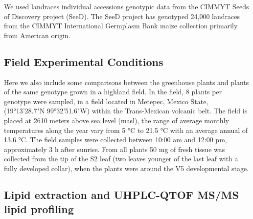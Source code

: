\documentclass[9pt,twocolumn,twoside,lineno]{gsajnl}
\begin{document}
We used landraces individual accessions genotypic data from the CIMMYT Seeds of Discovery project (SeeD). The SeeD project has genotyped 24,000 landraces from the  CIMMYT International Germplasm Bank maize collection primarily from American origin.


\subsection{Field Experimental Conditions} 
Here we also include some comparisons between the greenhouse plants and plants of the same genotype grown in a highland field. In the field, 8 plants per genotype were sampled, in a field located in Metepec, Mexico State, (19°13'28.7"N 99°32'51.6"W) within the Trans-Mexican volcanic belt. The field is placed at 2610 meters above sea level (masl), the range of average monthly temperatures along the year vary from 5 °C to 21.5 °C with an average annual of 13.6 °C. The field samples were collected between 10:00 am and 12:00 pm, approximately 3 h after sunrise.  From all plants 50 mg of fresh tissue was collected from the tip of the S2 leaf (two leaves younger of the last leaf with a fully developed collar), when the plants were around the V5 developmental stage. 

\subsection{Lipid extraction and UHPLC-QTOF MS/MS lipid profiling} 
\end{document}
